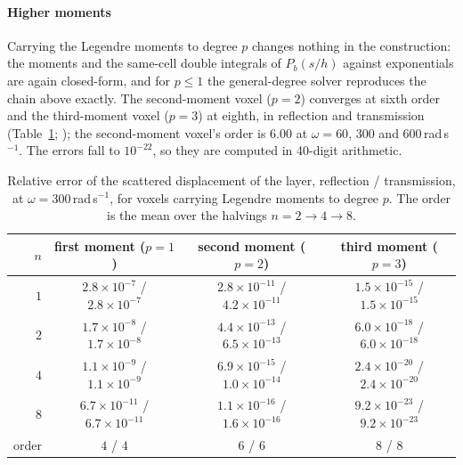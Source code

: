 \documentclass[preprint,review,12pt]{elsarticle}
\begin{document}
\paragraph{Higher moments} Carrying the Legendre moments to degree $p$ changes nothing in the
construction: the moments and the same-cell double integrals of $P_b(s/h)$ against exponentials are
again closed-form, and for $p\le1$ the general-degree solver reproduces the chain above exactly. The
second-moment voxel ($p=2$) converges at sixth order and the third-moment voxel ($p=3$) at eighth, in
reflection and transmission (Table~\ref{tab:higher}; ); the
second-moment voxel's order is $6.00$ at $\omega=60$, $300$ and $600$\,rad\,s$^{-1}$. The errors fall to
$10^{-22}$, so they are computed in 40-digit arithmetic.
\begin{table}[htbp]
\centering
\caption{Relative error of the scattered displacement of the layer, reflection / transmission, at
$\omega=300$\,rad\,s$^{-1}$, for voxels carrying Legendre moments to degree $p$. The order is the mean
over the halvings $n=2\to4\to8$.}\label{tab:higher}
\small\setlength{\tabcolsep}{4pt}
\begin{tabular}{@{}rccc@{}}
\toprule
$n$ & first moment ($p=1$) & second moment ($p=2$) & third moment ($p=3$) \\
\midrule
$1$ & $2.8\times10^{-7}$ / $2.8\times10^{-7}$ & $2.8\times10^{-11}$ / $4.2\times10^{-11}$ &
      $1.5\times10^{-15}$ / $1.5\times10^{-15}$ \\
$2$ & $1.7\times10^{-8}$ / $1.7\times10^{-8}$ & $4.4\times10^{-13}$ / $6.5\times10^{-13}$ &
      $6.0\times10^{-18}$ / $6.0\times10^{-18}$ \\
$4$ & $1.1\times10^{-9}$ / $1.1\times10^{-9}$ & $6.9\times10^{-15}$ / $1.0\times10^{-14}$ &
      $2.4\times10^{-20}$ / $2.4\times10^{-20}$ \\
$8$ & $6.7\times10^{-11}$ / $6.7\times10^{-11}$ & $1.1\times10^{-16}$ / $1.6\times10^{-16}$ &
      $9.2\times10^{-23}$ / $9.2\times10^{-23}$ \\
order & $4$ / $4$ & $6$ / $6$ & $8$ / $8$ \\
\bottomrule
\end{tabular}
\end{table}
\end{document}
